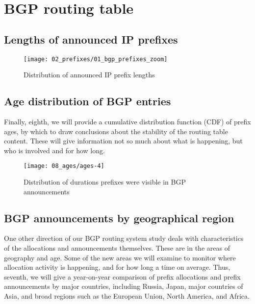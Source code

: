 \section{BGP routing table}
\label{sec:bgp}


\subsection{Lengths of announced IP prefixes}

\begin{figure}[htbp]
	\centering
		\texttt{[image: 02\_prefixes/01\_bgp\_prefixes\_zoom]}
	\caption{Distribution of announced IP prefix lengths}
	\label{fig:bgp prefix distribution}
\end{figure}

\subsection{Age distribution of BGP entries}
Finally, eighth, we will provide a cumulative distribution function (CDF) of prefix ages, by which to draw conclusions about the stability of the routing table content. These will give information not so much about what is happening, but who is involved and for how long.
	
\begin{figure}[htbp]
	\centering
		\texttt{[image: 08\_ages/ages-4]}
	\caption{Distribution of durations prefixes were visible in BGP announcements}
	\label{fig:bgp ages}
\end{figure}
	
\subsection{BGP announcements by geographical region}
One other direction of our BGP routing system study deals with characteristics of the allocations and announcements themselves.  These are in the areas of geography and age.  Some of the new areas we will examine to monitor where allocation activity is happening, and for how long a time on average.  Thus, seventh, we will give a year-on-year comparison of prefix allocations and prefix announcements by major countries, including Russia, Japan, major countries of Asia, and broad regions such as the European Union, North America, and Africa.

